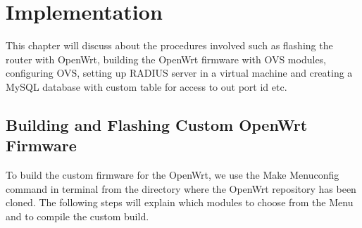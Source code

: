 \chapter{Implementation} \label{implementation}
This chapter will discuss about the procedures involved such as flashing the router with OpenWrt, building the OpenWrt firmware with OVS modules, configuring OVS, setting up RADIUS server in a virtual machine and creating a MySQL database with custom table for access to out port id etc.
\section{Building and Flashing Custom OpenWrt Firmware}
To build the custom firmware for the OpenWrt, we use the Make Menuconfig command in terminal from the directory where the OpenWrt repository has been cloned. The following steps will explain which modules to choose from the Menu and to compile the custom build.
